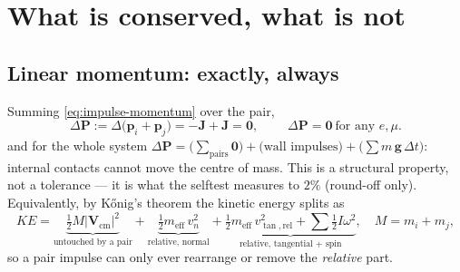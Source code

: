 \documentclass[a4paper,11pt]{article}
\newcommand{\VV}{\bm{V}}
\newcommand{\Jimp}{\bm{J}}
\newcommand{\pp}{\bm{p}}          %
\newcommand{\PP}{\bm{P}}          %
\begin{document}
\section{What is conserved, what is not}

\subsection{Linear momentum: exactly, always}
Summing \eqref{eq:impulse-momentum} over the pair,
\begin{equation}
  \Delta\PP:=\Delta\bigl(\pp_i+\pp_j\bigr)=-\Jimp+\Jimp=\bm 0 ,
  \qquad\boxed{\;\Delta\PP=\bm 0\ \text{for any }e,\mu.}
  \label{eq:momentum}
\end{equation}
and for the whole system $\Delta\PP=\bigl(\sum_{\text{pairs}}\bm 0\bigr)
+\bigl(\text{wall impulses}\bigr)+\bigl(\sum m\,\bm g\,\Delta t\bigr)$: internal
contacts cannot move the centre of mass. This is a structural property, not a
tolerance --- it is what the selftest measures to $2\%$ (round-off only).
Equivalently, by K{\H o}nig's theorem the kinetic energy splits as
\begin{equation}
  KE=\underbrace{\tfrac12 M|\VV_{\text{cm}}|^2}_{\text{untouched by a pair}}
    +\underbrace{\tfrac12 m_{\text{eff}}\,v_n^{2}}_{\text{relative, normal}}
    +\underbrace{\tfrac12 m_{\text{eff}}\,v_{\tan,\text{rel}}^{2}
    +\sum \tfrac12 I\omega^2}_{\text{relative, tangential + spin}},
  \quad M=m_i+m_j,
  \label{eq:konig}
\end{equation}
so a pair impulse can only ever rearrange or remove the \emph{relative} part.
\end{document}
